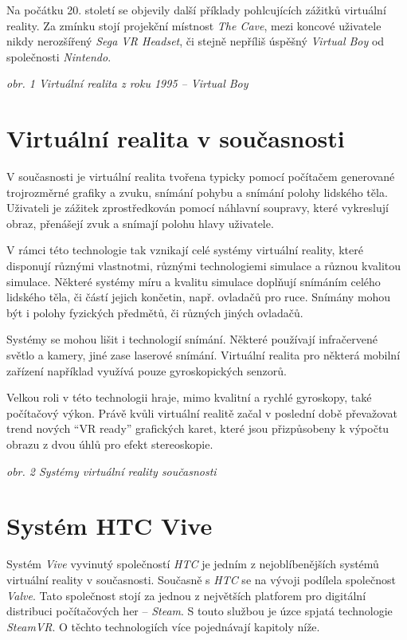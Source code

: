 Na počátku 20. století se objevily další příklady pohlcujících zážitků
virtuální reality. Za zmínku stojí projekční místnost \emph{The Cave},
mezi koncové uživatele nikdy nerozšířený \emph{Sega VR Headset}, či
stejně nepříliš úspěšný \emph{Virtual Boy} od společnosti
\emph{Nintendo}.


\emph{obr. 1 Virtuální realita z roku 1995 -- Virtual Boy}

\section{Virtuální realita v
současnosti}\label{virtuuxe1lnuxed-realita-v-souux10dasnosti}

V současnosti je virtuální realita tvořena typicky pomocí počítačem
generované trojrozměrné grafiky a zvuku, snímání pohybu a snímání polohy
lidského těla. Uživateli je zážitek zprostředkován pomocí náhlavní
soupravy, které vykreslují obraz, přenášejí zvuk a snímají polohu hlavy
uživatele.

V rámci této technologie tak vznikají celé systémy virtuální reality,
které disponují různými vlastnotmi, různými technologiemi simulace a
různou kvalitou simulace. Některé systémy míru a kvalitu simulace
doplňují snímáním celého lidského těla, či částí jejich končetin, např.
ovladačů pro ruce. Snímány mohou být i polohy fyzických předmětů, či
různých jiných ovladačů. 

Systémy se mohou lišit i technologií snímání.
Některé používají infračervené světlo a kamery, jiné zase laserové
snímání. Virtuální realita pro některá mobilní zařízení například
využívá pouze gyroskopických senzorů.

Velkou roli v této technologii hraje, mimo kvalitní a rychlé gyroskopy,
také počítačový výkon. Právě kvůli virtuální realitě začal v poslední
době převažovat trend nových ``VR ready'' grafických karet, které jsou
přizpůsobeny k výpočtu obrazu z dvou úhlů pro efekt stereoskopie.


\emph{obr. 2 Systémy virtuální reality současnosti}

\section{Systém HTC Vive}\label{systuxe9m-htc-vive}

Systém \emph{Vive} vyvinutý společností \emph{HTC} je jedním z
nejoblíbenějších systémů virtuální reality v současnosti. Současně s
\emph{HTC} se na vývoji podílela společnost \emph{Valve}. Tato
společnost stojí za jednou z největších platforem pro digitální
distribuci počítačových her -- \emph{Steam}. S touto službou je úzce
spjatá technologie \emph{SteamVR}. O těchto technologiích více
pojednávají kapitoly níže.

